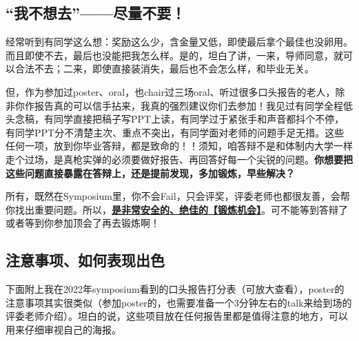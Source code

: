 \subsection{“我不想去”——尽量不要！}

经常听到有同学这么想：奖励这么少，含金量又低，即使最后拿个最佳也没卵用。而且即使不去，最后也没能把我怎么样。是的，坦白了讲，一来，导师同意，就可以合法不去；二来，即使直接装消失，最后也不会怎么样，和毕业无关。

但，作为参加过poster、oral，也chair过三场oral、听过很多口头报告的老人，除非你作报告真的可以信手拈来，我真的强烈建议你们去参加！我见过有同学全程低头念稿，有同学直接把稿子写PPT上读，有同学过于紧张手和声音都抖个不停，有同学PPT分不清楚主次、重点不突出，有同学面对老师的问题手足无措。这些任何一项，放到你毕业答辩，都是致命的！！须知，咱答辩不是和体制内大学一样走个过场，是真枪实弹的必须要做好报告、再回答好每一个尖锐的问题。\textbf{你想要把这些问题直接暴露在答辩上，还是提前发现，多加锻炼，早些解决？}

所有，既然在Symposium里，你不会Fail，只会评奖，评委老师也都很友善，会帮你找出重要问题。所以，\uline{\textbf{是非常安全的、绝佳的【锻炼机会】}}。可不能等到答辩了或者等到你参加顶会了再去锻炼啊！

\subsection{注意事项、如何表现出色}

下面附上我在2022年symposium看到的口头报告打分表（可放大查看），poster的注意事项其实很类似（参加poster的，也需要准备一个3分钟左右的talk来给到场的评委老师介绍）。坦白的说，这些项目放在任何报告里都是值得注意的地方，可以用来仔细审视自己的海报。

